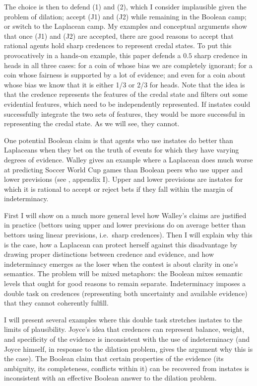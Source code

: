 \documentclass[11pt]{article}
\begin{document}
The choice is then to defend (1) and (2), which I consider implausible
given the problem of dilation; accept (J1) and (J2) while remaining in
the Boolean camp; or switch to the Laplacean camp. My examples and
conceptual arguments show that once (J1) and (J2) are accepted, there
are good reasons to accept that rational agents hold sharp credences
to represent credal states. To put this provocatively in a hands-on
example, this paper defends a $0.5$ sharp credence in heads in all
three cases: for a coin of whose bias we are completely ignorant; for
a coin whose fairness is supported by a lot of evidence; and even for
a coin about whose bias we know that it is either 1/3 or 2/3 for
heads. Note that the idea is that the credence represents the
{\doxnotep} features of the credal state and filters out some
evidential features, which need to be independently represented. If
instates could successfully integrate the two sets of features, they
would be more successful in representing the credal state. As we will
see, they cannot.

One potential Boolean claim is that agents who use instates do better
than Laplaceans when they bet on the truth of events for which they
have varying degrees of evidence. Walley gives an example where a
Laplacean does much worse at predicting Soccer World Cup games than
Boolean peers who use upper and lower previsions (see
, appendix I). Upper and lower previsions are
instates for which it is rational to accept or reject bets if they
fall within the margin of indeterminacy.

First I will show on a much more general level how Walley's claims are
justified in practice (bettors using upper and lower previsions do on
average better than bettors using linear previsions, i.e.\ sharp
credences). Then I will explain why this is the case, how a Laplacean
can protect herself against this disadvantage by drawing proper
distinctions between credence and evidence, and how indeterminacy
emerges as the loser when the contest is about clarity in one's
semantics. The problem will be mixed metaphors: the Boolean mixes
semantic levels that ought for good reasons to remain separate.
Indeterminacy imposes a double task on credences (representing both
uncertainty and available evidence) that they cannot coherently
fulfill.

I will present several examples where this double task stretches
instates to the limits of plausibility. Joyce's idea that credences
can represent balance, weight, and specificity of the evidence is
inconsistent with the use of indeterminacy (and Joyce himself, in
response to the dilation problem, gives the argument why this is the
case). The Boolean claim that certain properties of the evidence (its
ambiguity, its completeness, conflicts within it) can be recovered
from instates is inconsistent with an effective Boolean answer to the
dilation problem.
\end{document}
